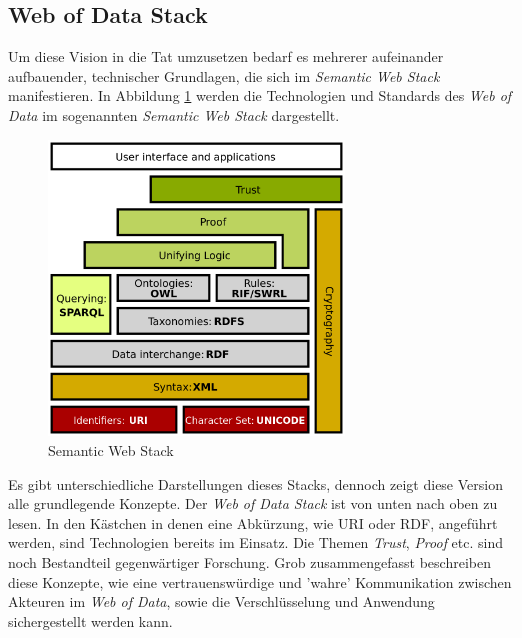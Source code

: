 \documentclass[12pt,a4paper]{article}
\begin{document}
\newpage
\subsection{Web of Data Stack}

Um diese Vision in die Tat umzusetzen bedarf es mehrerer aufeinander aufbauender, technischer Grundlagen, die sich im \textit{Semantic Web Stack} manifestieren.
In Abbildung \ref{fig:webstack} werden die Technologien und Standards des \textit{Web of Data} im sogenannten \textit{Semantic Web Stack} dargestellt.
\begin{figure}[h]
  \centering
	\includegraphics[width=0.7\textwidth]{img/web_stack.png}  
    \caption[Semantic Web Stack, \protect\url{en.wikipedia.org/wiki/Semantic_Web_Stack}, 29.12.2019.]{Semantic Web Stack}
  	\label{fig:webstack}
\end{figure}
Es gibt unterschiedliche Darstellungen dieses Stacks, dennoch zeigt diese Version alle grundlegende Konzepte. Der \textit{Web of Data Stack} ist von unten nach oben zu lesen. In den Kästchen in denen eine Abkürzung, wie URI oder RDF, angeführt werden, sind Technologien bereits im Einsatz. Die Themen \textit{Trust}, \textit{Proof} etc. sind noch Bestandteil gegenwärtiger Forschung. Grob zusammengefasst beschreiben diese Konzepte, wie eine vertrauenswürdige und 'wahre' Kommunikation zwischen Akteuren im \textit{Web of Data}, sowie die Verschlüsselung und Anwendung sichergestellt werden kann. 
\\
\end{document}

